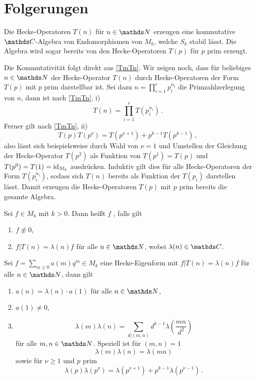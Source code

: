 \section{Folgerungen}

\begin{satz}
Die Hecke-Operatoren $T(n)$ für $n \in \NN$ erzeugen eine kommutative $\CC$-Algebra von Endomorphismen von $M_k$, welche $S_k$ stabil lässt. Die Algebra wird sogar bereits von den Hecke-Operatoren $T(p)$ für $p$ prim erzeugt.
\end{satz}

\begin{bewe}
Die Kommutativität folgt direkt aus \autoref{TmTn}. Wir zeigen noch, dass für beliebiges $n \in \NN$ der Hecke-Operator $T(n)$ durch Hecke-Operatoren der Form $T(p)$ mit $p$ prim darstellbar ist. Sei dazu $n = \prod_{i=1}^{r} p_i^{\alpha_i}$ die Primzahlzerlegung von $n$, dann ist nach \autoref{TmTn}, i)
\[
T(n) = \prod_{i=1}^{r} T(p_i^{\alpha_i})
\,.
\]
Ferner gilt nach \autoref{TmTn}, ii)
\[
T(p) T(p^\nu) = T(p^{\nu+1}) + p^{k-1} T(p^{k-1})
\,,
\]
also lässt sich beispielsweise durch Wahl von $\nu = 1$ und Umstellen der Gleichung der Hecke-Operator $T(p^2)$ als Funktion von $T(p^1) = T(p)$ und $T(p^0) = T(1) = \operatorname{id}_{M_k}$ ausdrücken. Induktiv gilt dies für alle Hecke-Operatoren der Form $T(p_i^{\alpha_i})$, sodass sich $T(n)$ bereits als Funktion der $T(p_i)$ darstellen lässt. Damit erzeugen die Hecke-Operatoren $T(p)$ mit $p$ prim bereits die gesamte Algebra.
\end{bewe}

\begin{defi}
Sei $f \in M_k$ mit $k > 0$. Dann heißt $f$ , falls gilt
\begin{enumerate}
\item $f \not \equiv 0$,
\item $f | T(n) = \lambda(n) f$ für alle $n \in \NN$, wobei $\lambda(n) \in \CC$.
\end{enumerate}
\end{defi}

\begin{satz}
Sei $f = \sum_{m \geq 0} a(m) q^m \in M_k$ eine Hecke-Eigenform mit $f | T(n) = \lambda(n) f$ für alle $n \in \NN$, dann gilt
\begin{enumerate}
\item $a(n) = \lambda(n) \cdot a(1)$ für alle $n \in \NN$,
\item $a(1) \neq 0$, 
\item \[
\lambda(m) \lambda(n) = \sum_{d \vert (m,n)} d^{k-1} \lambda \left( \frac {mn}{d^2} \right)
\]
für alle $m,n \in \NN$. Speziell ist für $(m, n) = 1$
\[
\lambda(m) \lambda(n) = \lambda(mn)
\]
sowie für $\nu \geq 1$ und $p$ prim
\[
\lambda(p) \lambda(p^\nu) = \lambda(p^{\nu+1}) + p^{k-1}\lambda(p^{\nu-1})
\,.
\]
\end{enumerate}
\end{satz}


